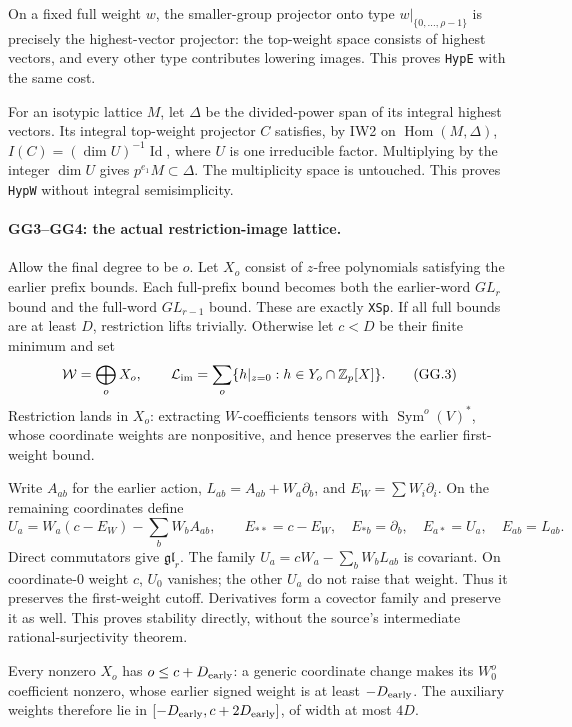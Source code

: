 On a fixed full weight $w$, the smaller-group projector onto type
$w|_{\{0,\ldots,\rho-1\}}$ is precisely the highest-vector projector:
the top-weight space consists of highest vectors, and every other
type contributes lowering images. This proves \texttt{HypE} with the
same cost.

For an isotypic lattice $M$, let $\Delta$ be the divided-power span
of its integral highest vectors. Its integral top-weight projector
$C$ satisfies, by IW2 on $\operatorname{Hom}(M,\Delta)$,
$I(C)=(\dim U)^{-1}\operatorname{Id}$, where $U$ is one irreducible
factor. Multiplying by the integer $\dim U$ gives
$p^{e_1}M\subset\Delta$. The multiplicity space is untouched.
This proves \texttt{HypW} without integral semisimplicity.

\paragraph{GG3--GG4: the actual restriction-image lattice.}
Allow the final degree to be $o$. Let $X_o$ consist of $z$-free
polynomials satisfying the earlier prefix bounds. Each full-prefix
bound becomes both the earlier-word $GL_r$ bound and the full-word
$GL_{r-1}$ bound. These are exactly \texttt{XSp}.
If all full bounds are at least $D$, restriction lifts trivially.
Otherwise let $c<D$ be their finite minimum and set
\[
 {\cal W}=\bigoplus_oX_o,\qquad
 {\cal L}_{\rm im}=\sum_o
       \{h|_{z=0}:h\in Y_o\cap\mathbb Z_p[X]\}.                 \tag{GG.3}
\]
Restriction lands in $X_o$: extracting $W$-coefficients tensors
with $\operatorname{Sym}^o(V)^*$, whose coordinate weights are
nonpositive, and hence preserves the earlier first-weight bound.

Write $A_{ab}$ for the earlier action,
$L_{ab}=A_{ab}+W_a\partial_b$, and $E_W=\sum W_i\partial_i$.
On the remaining coordinates define
\[
 U_a=W_a(c-E_W)-\sum_bW_bA_{ab},\qquad
 E_{**}=c-E_W,\quad E_{*b}=\partial_b,\quad
 E_{a*}=U_a,\quad E_{ab}=L_{ab}.                               \tag{GG.4}
\]
Direct commutators give $\mathfrak{gl}_r$.
The family $U_a=cW_a-\sum_bW_bL_{ab}$ is covariant.
On coordinate-$0$ weight $c$, $U_0$ vanishes; the other $U_a$
do not raise that weight. Thus it preserves the first-weight cutoff.
Derivatives form a covector family and preserve it as well.
This proves stability directly, without the source's intermediate
rational-surjectivity theorem.

Every nonzero $X_o$ has $o\le c+D_{\rm early}$: a generic coordinate
change makes its $W_0^o$ coefficient nonzero, whose earlier signed
weight is at least $-D_{\rm early}$. The auxiliary weights therefore
lie in $[-D_{\rm early},c+2D_{\rm early}]$, of width at most $4D$.

